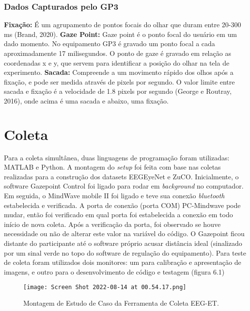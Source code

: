 \subsubsection{Dados Capturados pelo GP3}

\textbf{Fixação:} É um agrupamento de pontos focais do olhar que duram entre 20-300 ms (Brand, 2020). \textbf{Gaze Point:} Gaze point é o ponto focal do usuário em um dado momento. No equipamento GP3 é gravado um ponto focal a cada aproximadamente 17 milisegundos.
O ponto de gaze é gravado em relação as coordenadas x e y, que servem para identificar a posição do olhar na tela de experimento. 
\textbf{Sacada:} Compreende a um movimento rápido dos olhos após a fixação, e pode ser medida através de pixels por segundo.
O valor limite entre sacada e fixação é a velocidade de 1.8 pixels por segundo (George e Routray, 2016), onde acima
é uma sacada e abaixo, uma fixação.





\section{Coleta}
Para a coleta simultânea, duas linguagens de programação foram utilizadas: MATLAB e Python. 
A montagem do \textit{setup} foi feita com base nas coletas realizadas para a construção dos datasets EEGEyeNet e 
 ZuCO. Inicialmente, o software Gazepoint Control foi ligado para rodar em \textit{background} no computador. 
Em seguida, o MindWave mobile II foi ligado e teve sua conexão \textit{bluetooth} estabelecida e verificada.
A porta de conexão (porta COM) PC-Mindwave pode mudar, então foi verificado em qual porta foi estabelecida a conexão 
em todo início de nova coleta. Após a verificação da porta, foi observado se houve necessidade ou não de alterar
este valor na variável do código. O Gazepoint
  ficou distante do participante até o software próprio acusar distância ideal
   (sinalizado por um sinal verde no topo do software de regulação do equipamento). 
   Para teste de coleta foram utilizados dois monitores: um para calibração e apresentação de imagens, 
   e outro para o desenvolvimento de código e testagem (figura 6.1) 


   \begin{figure}
    \centering
    \texttt{[image: Screen Shot 2022-08-14 at 00.54.17.png]}
    \caption{Montagem de Estudo de Caso da Ferramenta de Coleta EEG-ET.}
\end{figure}


